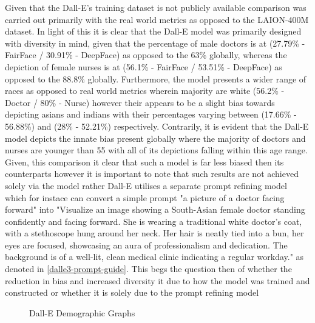 Given that the Dall-E's training dataset is not publicly available comparison was carried out primarily with the real world metrics as opposed to the LAION-400M dataset. In light of this it is clear that the Dall-E model was primarily designed with diversity in mind, given that the percentage of male doctors is at (27.79\% - FairFace / 30.91\% - DeepFace) as opposed to the 63\% globally, whereas the depiction of female nurses is at (56.1\% - FairFace / 53.51\% - DeepFace) as opposed to the 88.8\% globally. Furthermore, the model presents a wider range of races as opposed to real world metrics wherein majority are white (56.2\% - Doctor / 80\% - Nurse) however their appears to be a slight bias towards depicting asians and indians with their percentages varying between (17.66\% - 56.88\%) and (28\% - 52.21\%) respectively. Contrarily, it is evident that the Dall-E model depicts the innate bias present globally where the majority of doctors and nurses are younger than 55 with all of its depictions falling within this age range. Given, this comparison it clear that such a model is far less biased then its counterparts however it is important to note that such results are not achieved solely via the model rather Dall-E utilises a separate prompt refining model which for instace can convert a simple prompt "a picture of a doctor facing forward" into "Visualize an image showing a South-Asian female doctor standing confidently and facing forward. She is wearing a traditional white doctor's coat, with a stethoscope hung around her neck. Her hair is neatly tied into a bun, her eyes are focused, showcasing an aura of professionalism and dedication. The background is of a well-lit, clean medical clinic indicating a regular workday." as denoted in \ref{dalle3-prompt-guide}. This begs the question then of whether the reduction in bias and increased diversity it due to how the model was trained and constructed or whether it is solely due to the prompt refining model 

\begin{figure}[H]
\centering  
{}

\caption{Dall-E Demographic Graphs}\label{fig:Dall-E-Demographic-Graphs}
\end{figure}

